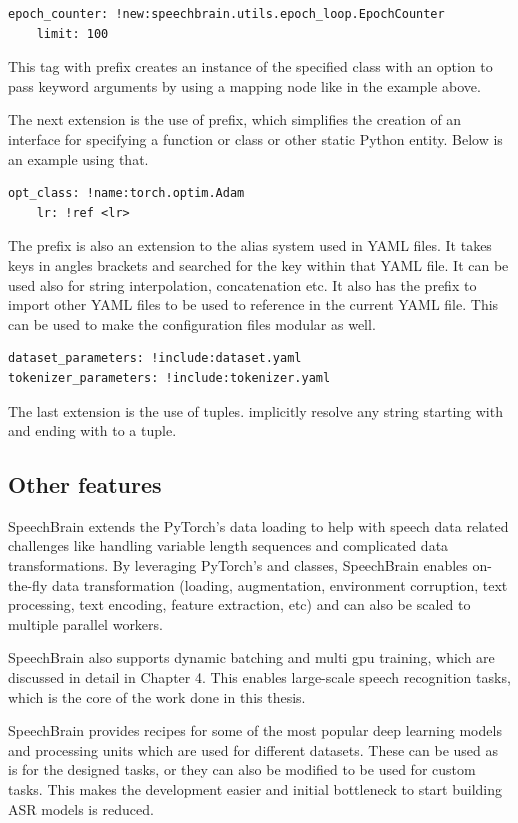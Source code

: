 \begin{verbatim}
epoch_counter: !new:speechbrain.utils.epoch_loop.EpochCounter
    limit: 100
\end{verbatim}

This tag with prefix  creates an instance of the specified class with an option to pass keyword arguments by using a mapping node like in the example above.

The next extension is the use of prefix,  which simplifies the creation of an interface for specifying a function or class or other static Python entity. Below is an example using that.
\begin{verbatim}
opt_class: !name:torch.optim.Adam
    lr: !ref <lr>
\end{verbatim}
The prefix  is also an extension to the alias system used in YAML files. It takes keys in angles brackets and searched for the key within that YAML file. It can be used also for string interpolation, concatenation etc. It also has the  prefix to import other YAML files to be used to reference in the current YAML file. This can be used to make the configuration files modular as well. 

\begin{verbatim}
dataset_parameters: !include:dataset.yaml
tokenizer_parameters: !include:tokenizer.yaml
\end{verbatim}

The last extension is the use of tuples. implicitly resolve any string starting with \inlinecode{(} and ending with \inlinecode{)} to a tuple.

\subsection{Other features}
SpeechBrain extends the PyTorch's data loading to help with speech data related challenges like handling variable length sequences and complicated data transformations. By leveraging PyTorch's  and  classes, SpeechBrain enables on-the-fly data transformation (loading, augmentation, environment corruption, text processing, text encoding, feature extraction, etc) and can also be scaled to multiple parallel workers.

SpeechBrain also supports dynamic batching and multi \acrshort{gpu} training, which are discussed in detail in Chapter 4. This enables large-scale speech recognition tasks, which is the core of the work done in this thesis.  

SpeechBrain provides recipes for some of the most popular deep learning models and processing units which are used for different datasets. These can be used as is for the designed tasks, or they can also be modified to be used for custom tasks. This makes the development easier and initial bottleneck to start building ASR models is reduced.
